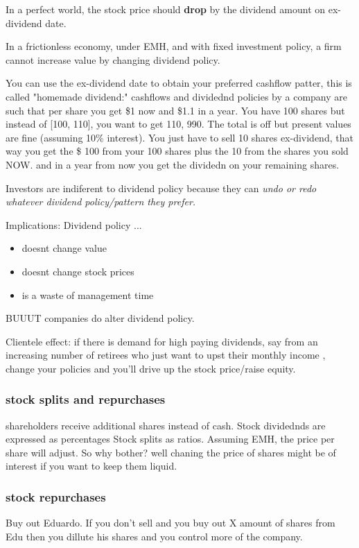 \documentclass{article}
\begin{document}
In a perfect world, the stock price should \textbf{drop} by the dividend amount on ex-dividend date. 

In a frictionless economy, under EMH, and with fixed investment policy, a firm cannot increase value by changing dividend policy.

You can use the ex-dividend date to obtain your preferred cashflow patter, this is called "homemade dividend:" cashflows and dividednd policies by a  company are such that per share you get \$1 now and \$1.1 in a year. You have 100 shares but instead of [100, 110], you want to get 110, 990. The total is off but present values are fine (assuming 10\% interest). You just have to sell 10 shares ex-dividend, that way you get the \$ 100 from your 100 shares plus the 10 from the shares you sold NOW. and in a year from now you get the dividedn on your remaining shares. 

Investors are indiferent to dividend policy because they can \textit{undo or redo whatever dividend policy/pattern they prefer.}

Implications: Dividend policy ...
\begin{itemize}
\item doesnt change value
\item doesnt change stock prices
\item is a waste of management time
\end{itemize}

BUUUT companies do alter dividend policy. 

Clientele effect: if there is demand for high paying dividends, say from an increasing number of retirees who just want to upst their monthly income , change your policies and you'll drive up the stock price/raise equity.

\subsubsection{stock splits and repurchases}
shareholders receive additional shares instead of cash. 
Stock dividednds are expressed as percentages
Stock splits as ratios. 
Assuming EMH, the price per share will adjust. So why bother? well chaning the price of shares might be of interest if you want to keep them liquid. 

\subsubsection{stock repurchases}
Buy out Eduardo. If you don't sell and you buy out X amount of shares from Edu then you dillute his shares and you control more of the company. 
\end{document}
